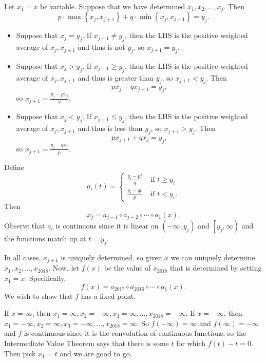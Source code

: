 Let $x_1=x$ be variable. Suppose that we have determined $x_1,x_2,\ldots,x_j$. Then \[p\cdot\max\left\{x_j,x_{j+1}\right\}+q\cdot\min\left\{x_j,x_{j+1}\right\}=y_j.\]

\begin{itemize}
	
	\item Suppose that $x_j=y_j$. If $x_{j+1}\neq y_j$, then the LHS is the positive weighted average of $x_j,x_{j+1}$ and thus is not $y_j$, so $x_{j+1}=y_j$.
	
	\item Suppose that $x_j>y_j$. If $x_{j+1}\geq y_j$, then the LHS is the positive weighted average of $x_j,x_{j+1}$ and thus is greater than $y_j$, so $x_{j+1}<y_j$. Then \[px_j+qx_{j+1}=y_j,\] so $x_{j+1}=\frac{y_j-px_j}{q}$.
	
	\item Suppose that $x_j<y_j$. If $x_{j+1}\leq y_j$, then the LHS is the positive weighted average of $x_j,x_{j+1}$ and thus is less than $y_j$, so $x_{j+1}>y_j$. Then \[px_{j+1}+qx_j=y_j,\] so $x_{j+1}=\frac{y_j-qx_j}{p}$.
	
\end{itemize}

Define \[a_i\left(t\right)=\begin{cases}
\frac{y_i-pt}{q} & \text{ if }t\geq y_i\\
\frac{y_i-qt}{p} & \text{ if }t<y_i.
\end{cases}\] Then \[x_j=a_{j-1}\circ a_{j-2}\circ\cdots\circ a_1\left(x\right).\] Observe that $a_i$ is continuous since it is linear on $\left(-\infty,y_j\right)$ and $\left[y_j,\infty\right)$ and the functions match up at $t=y_j$.

In all cases, $x_{j+1}$ is uniquely determined, so given $x$ we can uniquely determine $x_1,x_2,\ldots,x_{2018}$. Now, let $f\left(x\right)$ be the value of $x_{2018}$ that is determined by setting $x_1=x$. Specifically, \[f\left(x\right)=a_{2017}\circ a_{2016}\circ\cdots\circ a_1\left(x\right).\] We wish to show that $f$ has a fixed point.

If $x=\infty$, then $x_1=\infty,x_2=-\infty,x_3=\infty,\ldots,x_{2018}=-\infty$. If $x=-\infty$, then $x_1=-\infty,x_2=\infty,x_3=-\infty,\ldots,x_{2018}=\infty$. So $f\left(-\infty\right)=\infty$ and $f\left(\infty\right)=-\infty$ and $f$ is continuous since it is the convolution of continuous functions, so the Intermediate Value Theorem says that there is some $t$ for which $f\left(t\right)-t=0$. Then pick $x_1=t$ and we are good to go.